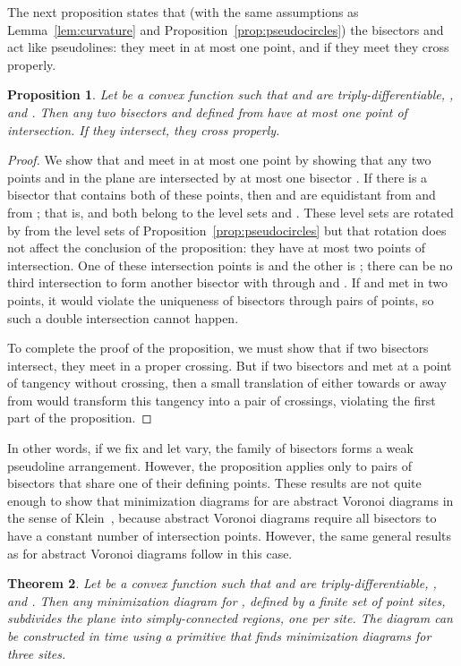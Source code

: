 \documentclass[10pt, conference, compsocconf]{IEEEtran}
\newtheorem{theorem}{Theorem}
\newtheorem{proposition}[theorem]{Proposition}
\begin{document}
The next proposition states that (with the same assumptions as Lemma~\ref{lem:curvature} and Proposition~\ref{prop:pseudocircles}) the bisectors  and  act like pseudolines: they meet in at most one point, and if they meet they cross properly.

\begin{proposition}
\label{prop:pseudolines}
Let  be a convex function such that  and  are triply-differentiable, , and . Then any two bisectors  and  defined from  have at most one point of intersection. If they intersect, they cross properly.
\end{proposition}

\begin{proof}
We show that  and  meet in at most one point by showing that any two points  and  in the plane are intersected by at most one bisector . If there is a bisector  that contains both of these points, then  and  are equidistant from  and from ; that is,  and  both belong to the level sets  and . These level sets are rotated by  from the level sets of Proposition~\ref{prop:pseudocircles} but that rotation does not affect the conclusion of the proposition: they have at most two points of intersection. One of these intersection points is  and the other is ; there can be no third intersection to form another bisector with  through  and . If  and  met in two points, it would violate the uniqueness of bisectors through pairs of points, so such a double intersection cannot happen.

To complete the proof of the proposition, we must show that if two bisectors intersect, they meet in a proper crossing. But if two bisectors  and  met at a point of tangency without crossing, then a small translation of  either towards or away from  would transform this tangency into a pair of crossings, violating the first part of the proposition.
\end{proof}

In other words, if we fix  and let  vary, the family of bisectors  forms a weak pseudoline arrangement. However, the proposition applies only to pairs of bisectors that share one of their defining points. These results are not quite enough to show that minimization diagrams for  are abstract Voronoi diagrams in the sense of Klein~\cite{Kle-89}, because abstract Voronoi diagrams require all bisectors to have a constant number of intersection points. However, the same general results as for abstract Voronoi diagrams follow in this case.

\begin{theorem}
\label{thm:voronoi}
Let  be a convex function such that  and  are triply-differentiable, , and . Then any minimization diagram for , defined by a finite set  of  point sites, subdivides the plane into  simply-connected regions, one per site. The diagram can be constructed in time  using a primitive that finds minimization diagrams for three sites.
\end{theorem}
\end{document}

